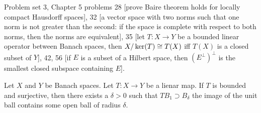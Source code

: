 

\begin{node}
Problem set 3, Chapter 5 problems 28 [prove Baire theorem holds for locally
  compact Hausdorff spaces], 32 [a vector space with two
  norms such that one norm is not greater than the second: if the
  space is complete with respect to both norms, then the norms are
  equivalent], 35 [let $T\colon X\to Y$ be a bounded linear operator
  between Banach spaces, then $X/\ker(T)\cong T(X)$ iff $T(X)$ is a
  closed subset of $Y$], 42, 56 [if $E$ is a subset of a Hilbert
  space, then $(E^{\perp})^{\perp}$ is the smallest closed subspace
  containing $E$].
\end{node}

\begin{theorem}
Let $X$ and $Y$ be Banach spaces. Let $T\colon X\to Y$ be a lienar map.
If $T$ is bounded and surjective, then there exists a $\delta>0$ such
that $TB_{1}\supset B_{\delta}$ the image of the unit ball contains
some open ball of radius $\delta$.
\end{theorem}

